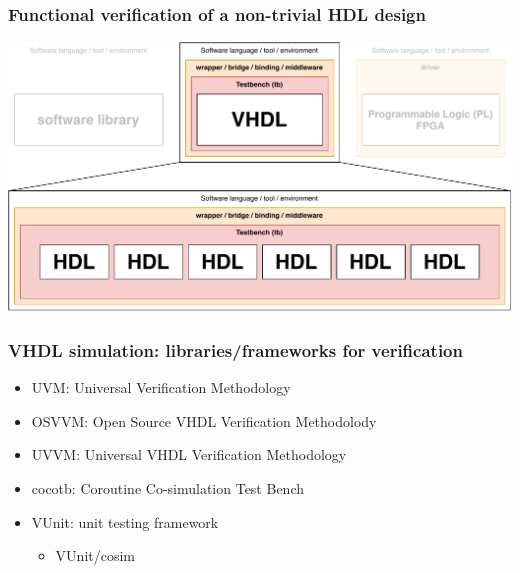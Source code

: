 \documentclass{beamer}
\begin{document}
\begin{frame}
\frametitle{Functional verification of a non-trivial HDL design}
\centering
\includegraphics[width=\linewidth]{cosim_zoom.pdf}
\end{frame}

\begin{frame}
\frametitle{VHDL simulation: libraries/frameworks for verification}
\begin{itemize}
\item UVM: Universal Verification Methodology \href{https://en.wikipedia.org/wiki/Universal_Verification_Methodology}{\faWikipediaW}
\vspace{.5em}

\item OSVVM: Open Source VHDL Verification Methodolody
\href{https://osvvm.org/}{\faGlobe}
\href{https://github.com/OSVVM/OSVVM}{\faGithub}
\vspace{.5em}

\item UVVM: Universal VHDL Verification Methodology \href{https://bitvis.no/dev-tools/uvvm/}{\faGlobe}
\href{https://github.com/UVVM}{\faGithub}
\vspace{2em}

\item cocotb: Coroutine Co-simulation Test Bench
\href{https://github.com/cocotb/cocotb}{\faGithub}
\href{https://cocotb.rtfd.io}{\faBook}
\href{http://potential.ventures/cocotb}{\faGlobe}
\href{https://pypi.org/project/cocotb/}{\faCode}
\vspace{.5em}

\item VUnit: unit testing framework
\href{https://github.com/VUnit/vunit}{\faGithub}
\href{http://vunit.github.io/}{\faBook}
\href{https://pypi.org/project/vunit-hdl/}{\faCode}

\begin{itemize}
\item VUnit/cosim
\href{https://github.com/VUnit/cosim}{\faGithub}
\href{https://vunit.github.io/cosim/}{\faBook}
\end{itemize}
\end{itemize}
\end{frame}
\end{document}
